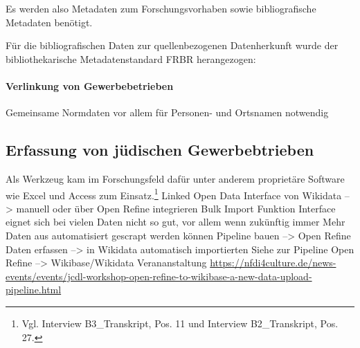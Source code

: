 Es werden also Metadaten zum Forschungsvorhaben sowie bibliografische Metadaten benötigt.

Für die bibliografischen Daten zur quellenbezogenen Datenherkunft wurde der bibliothekarische Metadatenstandard FRBR herangezogen:
\paragraph{Verlinkung von Gewerbebetrieben}
Gemeinsame Normdaten vor allem für Personen- und Ortsnamen notwendig
\subsection{Erfassung von jüdischen Gewerbebtrieben}

Als Werkzeug kam im Forschungsfeld dafür unter anderem proprietäre Software wie Excel und Access zum Einsatz.\footnote{Vgl. Interview B3\_Transkript, Pos. 11 und Interview B2\_Transkript, Pos. 27.}
Linked Open Data Interface von Wikidata --> manuell oder über Open Refine integrieren Bulk Import Funktion
Interface eignet sich bei vielen Daten nicht so gut, vor allem wenn zukünftig immer Mehr Daten aus automatisiert gescrapt werden können Pipeline bauen --> Open Refine Daten erfassen --> in Wikidata automatisch importierten
Siehe zur Pipeline Open Refine --> Wikibase/Wikidata Verananstaltung \url{https://nfdi4culture.de/news-events/events/jcdl-workshop-open-refine-to-wikibase-a-new-data-upload-pipeline.html}
